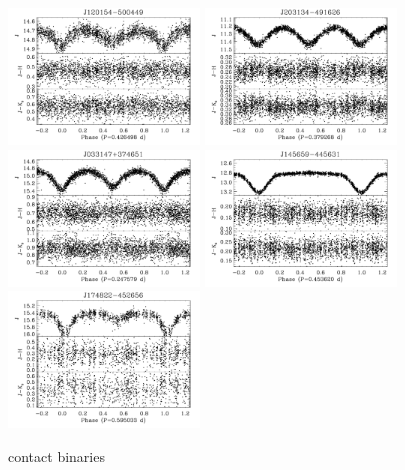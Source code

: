 \documentclass[]{emulateapj}
\begin{document}
\begin{figure}[]
\includegraphics[width=2.0in]{new_plots/bb1_16}
\includegraphics[width=2.0in]{new_plots/bb1_17}
\includegraphics[width=2.0in]{new_plots/bb1_18}
\includegraphics[width=2.0in]{new_plots/bb1_21}
\includegraphics[width=2.0in]{new_plots/bb1_28}
\caption{contact binaries}
\label{bin1}
\end{figure}
\end{document}
